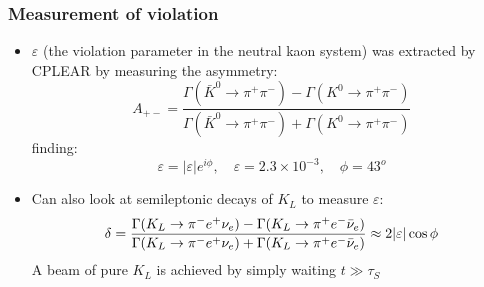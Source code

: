 \subsubsection{Measurement of \CP violation}
\begin{itemize}
  \item $\varepsilon$ (the \CP violation parameter in the neutral kaon system) was extracted by CPLEAR by measuring the asymmetry:
  \begin{equation}
    A_{+-} = \frac{\Gamma(\bar K^0 \rightarrow \pi^+\pi^-)-\Gamma(K^0 \rightarrow \pi^+\pi^-)}{\Gamma(\bar K^0 \rightarrow \pi^+\pi^-)+\Gamma(K^0 \rightarrow \pi^+\pi^-)}
  \end{equation}
  finding:
  \begin{equation}
    \varepsilon = |\varepsilon|e^{i\phi}, \quad \varepsilon = 2.3 \times 10^{-3}, \quad \phi = 43^o
  \end{equation}
  \item Can also look at semileptonic decays of $K_L$ to measure $\varepsilon$:
  \begin{equation}
    \delta = \frac{\Gamma(K_L \rightarrow \pi^-e^+\nu_e)-\Gamma(K_L \rightarrow \pi^+e^-{\bar{\nu}}_e)}{\Gamma(K_L \rightarrow \pi^-e^+\nu_e)+\Gamma(K_L \rightarrow \pi^+e^-{\bar{\nu}}_e)}  \approx 2|\varepsilon|\cos\phi
  \end{equation}
  A beam of pure $K_L$ is achieved by simply waiting $t\gg \tau_S$
\end{itemize}

